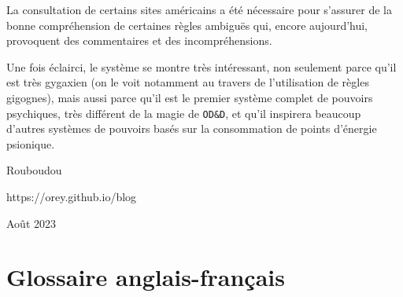 \documentclass[11pt]{article}
\begin{document}
La consultation de certains sites américains a été nécessaire pour s'assurer de la bonne compréhension de certaines règles ambiguës qui, encore aujourd'hui, provoquent des commentaires et des incompréhensions.

Une fois éclairci, le système se montre très intéressant, non seulement parce qu'il est très \og gygaxien \fg{} (on le voit notamment au travers de l'utilisation de règles gigognes), mais aussi parce qu'il est le premier système complet de pouvoirs psychiques, très différent de la magie de \texttt{OD\&D}, et qu'il inspirera beaucoup d'autres systèmes de pouvoirs basés sur la consommation de points d'énergie psionique.

\vspace{0.7cm}

\noindent Rouboudou

\noindent https://orey.github.io/blog

\noindent Août 2023

\newpage


\tableofcontents
{}







\newpage
\phantom{-}
\newpage


\newpage
\phantom{-}
\newpage




\begin{comment}
\newpage
\begin{center}
{\color{orange}\MEGA{NEOMEGA}}
\end{center}
\end{comment}

\newpage
{}\section*{Glossaire anglais-français}
\end{document}
